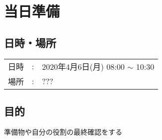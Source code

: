 
%
\section{当日準備}


\subsection{日時・場所}
\begin{tabular}{p{}rp{}}
  日時 & : & 2020年4月6日(月) 08:00 $\sim$ 10:30\\ %
  場所 & : & ???                                 %
\end{tabular}

\vspace{-5mm}
\subsection{目的}
準備物や自分の役割の最終確認をする

\vspace{-5mm}
